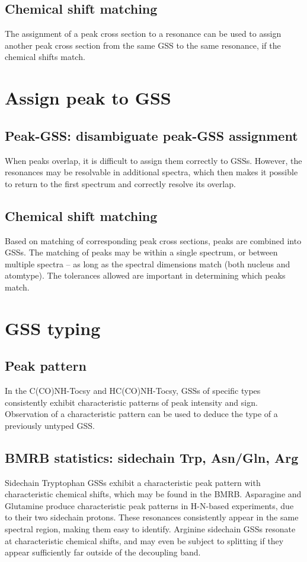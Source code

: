 \subsection*{Chemical shift matching}
The assignment of a peak cross section to a resonance can be used to assign 
another peak cross section from the same GSS to the same resonance, if the 
chemical shifts match.



\section*{Assign peak to GSS}

\subsection*{Peak-GSS: disambiguate peak-GSS assignment}
When peaks overlap, it is difficult to assign them correctly to GSSs.  However,
the resonances may be resolvable in additional spectra, which then makes it
possible to return to the first spectrum and correctly resolve its overlap.

\subsection*{Chemical shift matching}
Based on matching of corresponding peak cross sections, peaks are combined into
GSSs.  The matching of peaks may be within a single spectrum, or between 
multiple spectra -- as long as the spectral dimensions match (both nucleus
and atomtype).  The tolerances allowed are important in determining which
peaks match.



\section*{GSS typing}

\subsection*{Peak pattern}
In the C(CO)NH-Tocsy and HC(CO)NH-Tocsy, GSSs of specific types consistently
exhibit characteristic patterns of peak intensity and sign.  Observation of
a characteristic pattern can be used to deduce the type of a previously
untyped GSS.

\subsection*{BMRB statistics: sidechain Trp, Asn/Gln, Arg}
Sidechain Tryptophan GSSs exhibit a characteristic peak pattern with 
characteristic chemical shifts, which may be found in the BMRB.
Asparagine and Glutamine produce characteristic peak patterns in H-N-based 
experiments, due to their two sidechain protons.  These resonances consistently
appear in the same spectral region, making them easy to identify.
Arginine sidechain GSSs resonate at characteristic chemical shifts, and may
even be subject to splitting if they appear sufficiently far outside of the
decoupling band.

